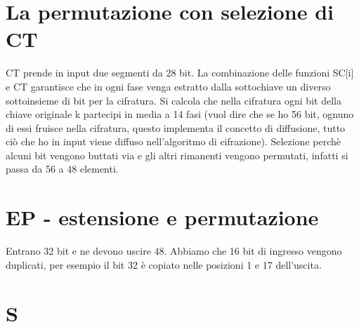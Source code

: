 \section{La permutazione con selezione di CT}

CT prende in input due segmenti da 28 bit. La combinazione delle funzioni SC[i] e CT garantisce che in ogni fase venga estratto dalla sottochiave un diverso
sottoinsieme di bit per la cifratura. Si calcola che nella cifratura ogni bit della chiave originale k partecipi in media a 14 fasi (vuol dire che se ho 56 bit, ognuno di essi fruisce nella cifratura, questo implementa il concetto di diffusione, tutto ciò che ho in input viene diffuso nell'algoritmo di cifrazione). Selezione perchè alcuni bit vengono buttati via e gli altri rimanenti vengono permutati, infatti si passa da 56 a 48 elementi. 

\section{EP - estensione e permutazione}

Entrano 32 bit e ne devono uscire 48. Abbiamo che 16 bit di ingresso vengono duplicati, per esempio il bit 32 è copiato nelle posizioni 1 e 17 dell'uscita. 

\section{S}

